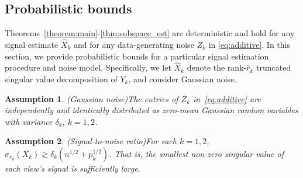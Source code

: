 \documentclass{amsart}
\newtheorem{assumption}{Assumption}
\begin{document}
{
\subsection{Probabilistic bounds}\label{sec:noisy_statistical}
Theorems~\ref{theorem:main}-\ref{thm:subspace_est} are deterministic and hold for any signal estimate $\widehat{X}_k$ and for any data-generating noise $Z_k$ in \eqref{eq:additive}. In this section, we provide probabilistic bounds for a particular signal estimation procedure and noise model. Specifically, we let $\widehat{X}_k$ denote the rank-$\widehat{r}_k$ truncated singular value decomposition of $Y_k$, and consider Gaussian noise.
\begin{assumption}(Gaussian noise)\label{a:noise}
The entries of $Z_k$ in~\eqref{eq:additive} are independently and identically distributed as zero-mean Gaussian random variables with variance $\delta_k$, $k=1,2$.
\end{assumption}

\begin{assumption}(Signal-to-noise ratio)\label{a:signal_noise_ratio} For each $k = 1,2$, $\sigma_{r_k}(X_k) \gtrsim \delta_k(n^{1/2}+p_k^{1/2})$. That is, the smallest non-zero singular value of each view's signal is sufficiently large.
\end{assumption}


}
\end{document}
